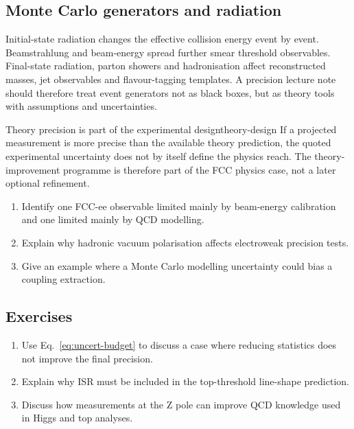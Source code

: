 \documentclass[11pt,a4paper]{article}
\numberwithin{equation}{section}
\begin{document}
\subsection{Monte Carlo generators and radiation}
Initial-state radiation changes the effective collision energy event by event. Beamstrahlung and beam-energy spread further smear threshold observables. Final-state radiation, parton showers and hadronisation affect reconstructed masses, jet observables and flavour-tagging templates. A precision lecture note should therefore treat event generators not as black boxes, but as theory tools with assumptions and uncertainties.

\begin{remarkbox}{Theory precision is part of the experimental design}{theory-design}
If a projected measurement is more precise than the available theory prediction, the quoted experimental uncertainty does not by itself define the physics reach. The theory-improvement programme is therefore part of the FCC physics case, not a later optional refinement.
\end{remarkbox}

\begin{guidedchecksbox}
\begin{enumerate}[leftmargin=1.6em]
\item Identify one FCC-ee observable limited mainly by beam-energy calibration and one limited mainly by QCD modelling.
\item Explain why hadronic vacuum polarisation affects electroweak precision tests.
\item Give an example where a Monte Carlo modelling uncertainty could bias a coupling extraction.
\end{enumerate}
\end{guidedchecksbox}

\subsection{Exercises}
\begin{enumerate}[leftmargin=1.6em]
\item Use Eq.~\eqref{eq:uncert-budget} to discuss a case where reducing statistics does not improve the final precision.
\item Explain why ISR must be included in the top-threshold line-shape prediction.
\item Discuss how measurements at the Z pole can improve QCD knowledge used in Higgs and top analyses.
\end{enumerate}
\end{document}

